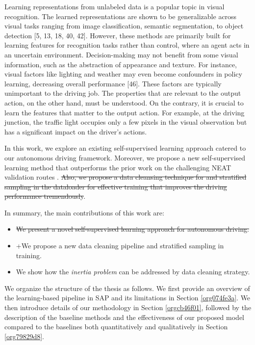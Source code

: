 \documentclass[letterpaper, 12pt]{article}
\theoremstyle{definition}
\theoremstyle{definition}
\theoremstyle{definition}
\theoremstyle{definition}
\theoremstyle{definition}
\begin{document}
Learning representations from unlabeled data is a popular topic in visual
recognition. The learned representations are shown to be generalizable across
visual tasks ranging from image classification, semantic segmentation, to object
detection [5, 13, 18, 40, 42]. However, these methods are primarily built for
learning features for recognition tasks rather than control, where an agent acts
in an uncertain environment. Decision-making may not benefit from some visual
information, such as the abstraction of appearance and texture. For instance,
visual factors like lighting and weather may even become confounders in policy
learning, decreasing overall performance [46]. These factors are typically
unimportant to the driving job. The properties that are relevant to the output
action, on the other hand, must be understood.
On the contrary, it is crucial
to learn the features that matter to the output action. For example, at the
driving junction, the traffic light occupies only a few pixels in the visual
observation but has a significant impact on the driver’s actions.

In this work, we explore an existing self-supervised learning approach catered
to our autonomous driving framework. Moreover, we propose a new self-supervised
learning method that outperforms the prior work on the challenging NEAT
validation routes \cite{Chitta2021}. \sout{Also, we propose a data cleansing
technique for and stratified sampling in the dataloader for effective training
that improves the driving performance tremendously}.



In summary, the main contributions of this work are:
\begin{itemize}
\item \sout{We present a novel self-supervised learning approach for autonomous driving.}
\item +We propose a new data cleaning pipeline and stratified sampling in training.
\item We show how the \emph{inertia problem} can be addressed by data cleaning strategy.
\end{itemize}

We organize the structure of the thesis as follows. We first provide an overview
of the learning-based pipeline in SAP and its limitations in Section \ref{org074fe3a}. We
then introduce details of our methodology in Section \ref{orgcb46f01}, followed by the
description of the baseline methods and the effectiveness of our proposed model
compared to the baselines both quantitatively and qualitatively in Section
\ref{org79829d8}.
\end{document}
